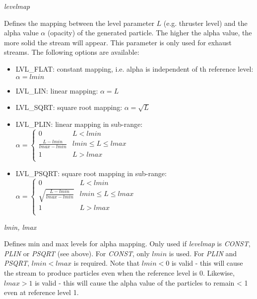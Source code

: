 \documentclass[Orbiter Developer Manual.tex]{subfiles}
\begin{document}
\noindent
\textit{levelmap}
\begin{adjustwidth}{1cm}{0cm}
Defines the mapping between the level parameter $L$ (e.g. thruster level) and the alpha value $\alpha$ (opacity) of the generated particle. The higher the alpha value, the more solid the stream will appear. This parameter is only used for exhaust streams. The following options are available:

\begin{itemize}
\item LVL\_FLAT: constant mapping, i.e. alpha is independent of th reference level: $\alpha = lmin$
\item LVL\_LIN: linear mapping: $\alpha = L$
\item LVL\_SQRT: square root mapping: $\alpha = \sqrt{L}$
\item LVL\_PLIN: linear mapping in sub-range: $\alpha = 
\left\{
\begin{array}{ll}
	0 & L < lmin \\
	\frac{L - lmin}{lmax - lmin} & lmin \leq L \leq lmax \\
	1 & L > lmax \\
\end{array} 
\right. $
\item LVL\_PSQRT: square root mapping in sub-range: $\alpha =
\left\{
\begin{array}{ll}
	0 & L < lmin \\
	\sqrt{\frac{L - lmin}{lmax - lmin}} & lmin \leq L \leq lmax \\
	1 & L > lmax \\
\end{array} 
\right. $
\end{itemize}
\end{adjustwidth}

\noindent
\textit{lmin, lmax}
\begin{adjustwidth}{1cm}{0cm}
Defines min and max levels for alpha mapping. Only used if \textit{levelmap} is \textit{CONST}, \textit{PLIN} or \textit{PSQRT} (see above). For \textit{CONST}, only $lmin$ is used. For \textit{PLIN} and \textit{PSQRT}, $lmin < lmax$ is required. Note that $lmin < 0$ is valid - this will cause the stream to produce particles even when the reference level is 0. Likewise, $lmax > 1$ is valid - this will cause the alpha value of the particles to remain < 1 even at reference level 1.
\\
\end{adjustwidth}
\end{document}
